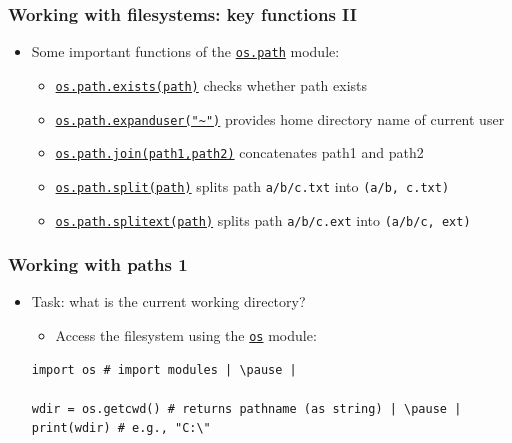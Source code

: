 \documentclass[xcolor=table]{beamer}
\begin{document}
\begin{frame}[fragile]
    \frametitle{Working with filesystems: key functions II}
        \begin{itemize}\addtolength{\itemsep}{\baselineskip}
            \item Some important functions of the \href{https://docs.python.org/3.7/library/os.html#module-os.path}{\texttt{os.path}} module:\pause
                \begin{itemize}\addtolength{\itemsep}{\baselineskip}
                        \item \href{https://docs.python.org/3.7/library/os.path.html#os.path.exists}{\texttt{os.path.exists(path)}} checks whether path exists \pause
                        \item \href{https://docs.python.org/3.7/library/os.path.html#os.path.expanduser}{\texttt{os.path.expanduser("\textasciitilde")}} provides home directory name of current user \pause
                        \item \href{https://docs.python.org/3.7/library/os.path.html#os.path.join}{\texttt{os.path.join(path1,path2)}} concatenates path1 and path2  \pause
                        \item \href{https://docs.python.org/3.7/library/os.path.html#os.path.split}{\texttt{os.path.split(path)}} splits path \texttt{a/b/c.txt} into \texttt{(a/b, c.txt)} \pause
                        \item \href{https://docs.python.org/3.7/library/os.path.html#os.path.splitext}{\texttt{os.path.splitext(path)}} splits path \texttt{a/b/c.ext} into \texttt{(a/b/c, ext)} \pause
                \end{itemize}
        \end{itemize}
\end{frame}


\begin{frame}[fragile]
    \frametitle{Working with paths 1}
    \begin{itemize}
        \item Task: what is the current working directory? 
            \begin{itemize}
                \item Access the filesystem using the \href{https://docs.python.org/3.7/library/os.html#module-os}{\texttt{os}} module: \pause
            \end{itemize}
\begin{lstlisting}[style=python]
import os # import modules | \pause |

wdir = os.getcwd() # returns pathname (as string) | \pause |
print(wdir) # e.g., "C:\" 
\end{lstlisting}
    \end{itemize}
\end{frame}
\end{document}
